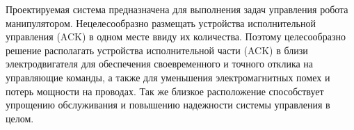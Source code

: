 Проектируемая система предназначена для выполнения задач управления  робота манипулятором. Нецелесообразно размещать устройства исполнительной управления (ACK) в одном месте ввиду их количества. Поэтому целесообразно решение располагать устройства исполнительной части (ACK) в близи электродвигателя для обеспечения своевременного и точного отклика на управляющие команды, а также для уменьшения электромагнитных помех и потерь мощности на проводах. Так же близкое расположение способствует упрощению обслуживания и повышению надежности системы управления в целом.



